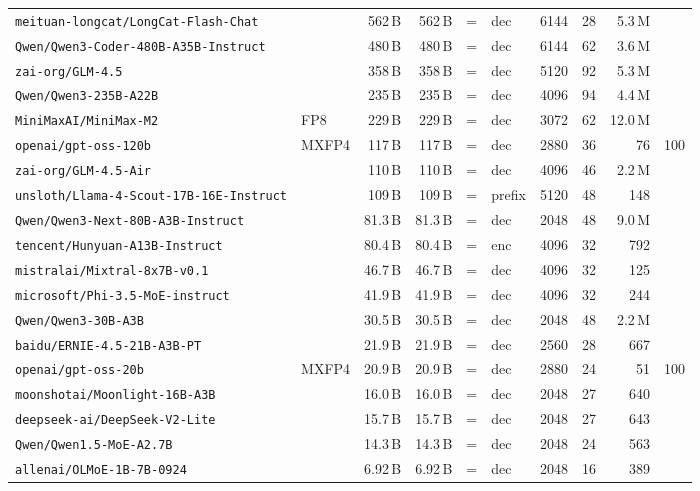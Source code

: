 \begin{longtable}{@{}llrrclrrrr@{}}
{\tiny\texttt{meituan-longcat/LongCat-Flash-Chat}} &  & 562\,B & 562\,B & = & dec & 6144 & 28 & 5.3\,M &  \\
{\tiny\texttt{Qwen/Qwen3-Coder-480B-A35B-Instruct}} &  & 480\,B & 480\,B & = & dec & 6144 & 62 & 3.6\,M &  \\
{\tiny\texttt{zai-org/GLM-4.5}} &  & 358\,B & 358\,B & = & dec & 5120 & 92 & 5.3\,M &  \\
{\tiny\texttt{Qwen/Qwen3-235B-A22B}} &  & 235\,B & 235\,B & = & dec & 4096 & 94 & 4.4\,M &  \\
{\tiny\texttt{MiniMaxAI/MiniMax-M2}} & FP8 & 229\,B & 229\,B & = & dec & 3072 & 62 & 12.0\,M &  \\
{\tiny\texttt{openai/gpt-oss-120b}} & MXFP4 & 117\,B & 117\,B & = & dec & 2880 & 36 & 76 & 100 \\
{\tiny\texttt{zai-org/GLM-4.5-Air}} &  & 110\,B & 110\,B & = & dec & 4096 & 46 & 2.2\,M &  \\
{\tiny\texttt{unsloth/Llama-4-Scout-17B-16E-Instruct}} &  & 109\,B & 109\,B & = & prefix & 5120 & 48 & 148 &  \\
{\tiny\texttt{Qwen/Qwen3-Next-80B-A3B-Instruct}} &  & 81.3\,B & 81.3\,B & = & dec & 2048 & 48 & 9.0\,M &  \\
{\tiny\texttt{tencent/Hunyuan-A13B-Instruct}} &  & 80.4\,B & 80.4\,B & = & enc & 4096 & 32 & 792 &  \\
{\tiny\texttt{mistralai/Mixtral-8x7B-v0.1}} &  & 46.7\,B & 46.7\,B & = & dec & 4096 & 32 & 125 &  \\
{\tiny\texttt{microsoft/Phi-3.5-MoE-instruct}} &  & 41.9\,B & 41.9\,B & = & dec & 4096 & 32 & 244 &  \\
{\tiny\texttt{Qwen/Qwen3-30B-A3B}} &  & 30.5\,B & 30.5\,B & = & dec & 2048 & 48 & 2.2\,M &  \\
{\tiny\texttt{baidu/ERNIE-4.5-21B-A3B-PT}} &  & 21.9\,B & 21.9\,B & = & dec & 2560 & 28 & 667 &  \\
{\tiny\texttt{openai/gpt-oss-20b}} & MXFP4 & 20.9\,B & 20.9\,B & = & dec & 2880 & 24 & 51 & 100 \\
{\tiny\texttt{moonshotai/Moonlight-16B-A3B}} &  & 16.0\,B & 16.0\,B & = & dec & 2048 & 27 & 640 &  \\
{\tiny\texttt{deepseek-ai/DeepSeek-V2-Lite}} &  & 15.7\,B & 15.7\,B & = & dec & 2048 & 27 & 643 &  \\
{\tiny\texttt{Qwen/Qwen1.5-MoE-A2.7B}} &  & 14.3\,B & 14.3\,B & = & dec & 2048 & 24 & 563 &  \\
{\tiny\texttt{allenai/OLMoE-1B-7B-0924}} &  & 6.92\,B & 6.92\,B & = & dec & 2048 & 16 & 389 &  \\

\end{longtable}
